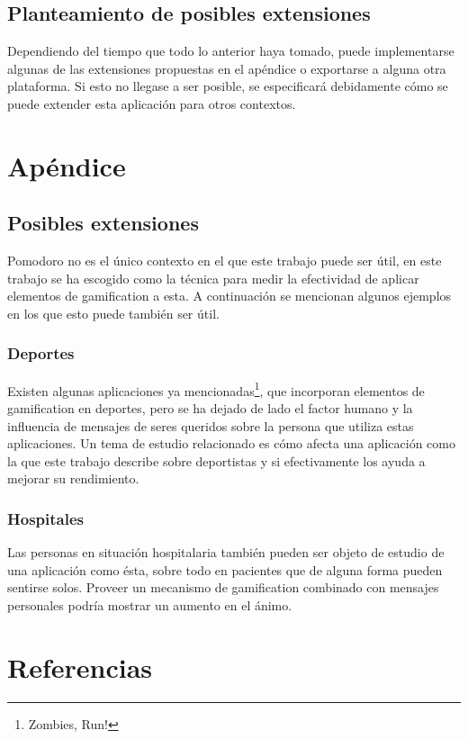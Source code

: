 \documentclass[12pt,letterpaper]{report}
\begin{document}
\hypertarget{planteamiento-de-posibles-extensiones}{%
\subsection{Planteamiento de posibles
extensiones}\label{planteamiento-de-posibles-extensiones}}

Dependiendo del tiempo que todo lo anterior haya tomado, puede
implementarse algunas de las extensiones propuestas en el apéndice o
exportarse a alguna otra plataforma. Si esto no llegase a ser posible,
se especificará debidamente cómo se puede extender esta aplicación para
otros contextos.

\newpage
\section{Apéndice}
\label{sec:apendice}

\subsection{Posibles extensiones}
\label{subsec:posibles-extensiones}

Pomodoro no es el único contexto en el que este trabajo puede ser
útil, en este trabajo se ha escogido como la técnica para medir la
efectividad de aplicar elementos de gamification a esta. A
continuación se mencionan algunos ejemplos en los que esto puede
también ser útil.

\subsubsection{Deportes}

Existen algunas aplicaciones ya mencionadas\footnote{Zombies, Run!},
que incorporan elementos de gamification en deportes, pero se ha
dejado de lado el factor humano y la influencia de mensajes de seres
queridos sobre la persona que utiliza estas aplicaciones. Un tema de
estudio relacionado es cómo afecta una aplicación como la que este
trabajo describe sobre deportistas y si efectivamente los ayuda a
mejorar su rendimiento.

\subsubsection{Hospitales}

Las personas en situación hospitalaria también pueden ser objeto de
estudio de una aplicación como ésta, sobre todo en pacientes que de
alguna forma pueden sentirse solos. Proveer un mecanismo de
gamification combinado con mensajes personales podría mostrar un
aumento en el ánimo.

\newpage
\section{Referencias}
\printbibliography[heading=none]
\end{document}
